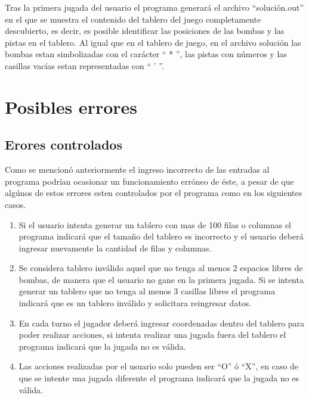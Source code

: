\documentclass[letterpaper,12pt]{report}
\begin{document}
Tras la primera jugada del usuario el programa generará el archivo ``solución.out'' en el que se muestra el contenido del tablero del juego completamente descubierto, es decir, es posible identificar las posiciones de las bombas y las pistas en el tablero. Al igual que en el tablero de juego, en el archivo solución las bombas estan simbolizadas con el carácter `` * '', las pistas con números y las casillas vacías estan representadas con `` ' ''.

\chapter{Posibles errores}

\section {Erores controlados}

Como se mencionó anteriormente el ingreso incorrecto de las entradas al programa podrían ocasionar un funcionamiento erróneo de éste, a pesar de que algúnos de estos errores esten controlados por el programa como en los siguientes casos.

\begin{enumerate}

\item Si el usuario intenta generar un tablero con mas de 100 filas o columnas el programa indicará que el tamaño del tablero es incorrecto y el usuario deberá ingresar nuevamente la cantidad de filas y columnas.

\item Se considera tablero inválido aquel que no tenga al menos 2 espacios libres de bombas, de manera que el usuario no gane en la primera jugada. Si se intenta generar un tablero que no tenga al menos 3 casillas libres el programa indicará que es un tablero inválido y solicitara reingresar datos.

\item En cada turno el jugador deberá ingresar coordenadas dentro del tablero para poder realizar acciones, si intenta realizar una jugada fuera del tablero el programa indicará que la jugada no es válida.

\item Las acciones realizadas por el usuario solo pueden ser ``O'' ó ``X'', en caso de que se intente una jugada diferente el programa indicará que la jugada no es válida.

\end{enumerate}
\end{document}
